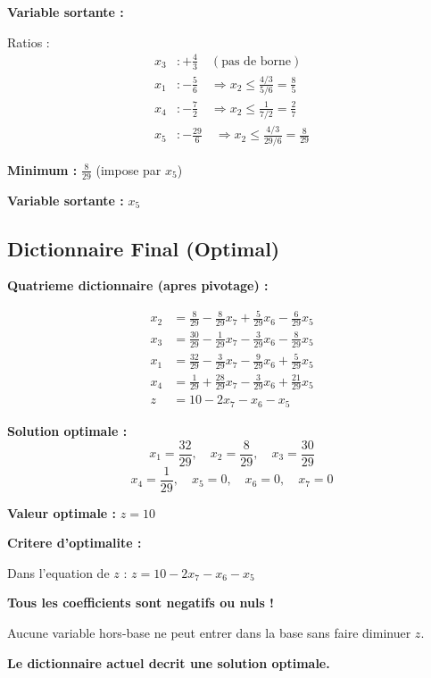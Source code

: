 \documentclass[12pt,a4paper]{article}
\begin{document}
\begin{methode}
\textbf{Variable sortante :}

Ratios :
\begin{align*}
x_3 &: +\frac{4}{3} \quad (\text{pas de borne})\\
x_1 &: -\frac{5}{6} \quad \Rightarrow x_2 \leq \frac{4/3}{5/6} = \frac{8}{5}\\
x_4 &: -\frac{7}{2} \quad \Rightarrow x_2 \leq \frac{1}{7/2} = \frac{2}{7}\\
x_5 &: -\frac{29}{6} \quad \Rightarrow x_2 \leq \frac{4/3}{29/6} = \frac{8}{29}
\end{align*}

\textbf{Minimum :} $\frac{8}{29}$ (impose par $x_5$)

\textbf{Variable sortante :} $x_5$
\end{methode}

\newpage
\subsection{Dictionnaire Final (Optimal)}

\begin{exemple}
\textbf{Quatrieme dictionnaire (apres pivotage) :}

\begin{align*}
x_2 &= \frac{8}{29} - \frac{8}{29}x_7 + \frac{5}{29}x_6 - \frac{6}{29}x_5\\
x_3 &= \frac{30}{29} - \frac{1}{29}x_7 - \frac{3}{29}x_6 - \frac{8}{29}x_5\\
x_1 &= \frac{32}{29} - \frac{3}{29}x_7 - \frac{9}{29}x_6 + \frac{5}{29}x_5\\
x_4 &= \frac{1}{29} + \frac{28}{29}x_7 - \frac{3}{29}x_6 + \frac{21}{29}x_5\\
z &= 10 - 2x_7 - x_6 - x_5
\end{align*}

\textbf{Solution optimale :}
$$x_1 = \frac{32}{29}, \quad x_2 = \frac{8}{29}, \quad x_3 = \frac{30}{29}$$
$$x_4 = \frac{1}{29}, \quad x_5 = 0, \quad x_6 = 0, \quad x_7 = 0$$

\textbf{Valeur optimale :} $z = 10$
\end{exemple}

\begin{important}
\textbf{Critere d'optimalite :}

Dans l'equation de $z$ : $z = 10 - 2x_7 - x_6 - x_5$

\textcolor{importantrouge}{\textbf{Tous les coefficients sont negatifs ou nuls !}}

Aucune variable hors-base ne peut entrer dans la base sans faire diminuer $z$.

\textcolor{defvert}{\textbf{Le dictionnaire actuel decrit une solution optimale.}}
\end{important}
\end{document}
